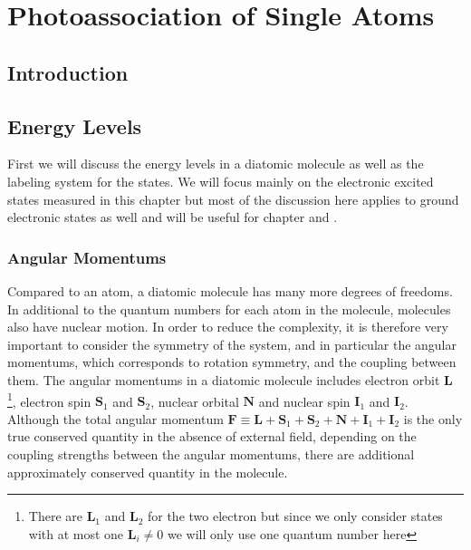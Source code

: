 
\chapter{Photoassociation of Single Atoms}
\label{ch:pa}

\section{Introduction}


\section{Energy Levels}

First we will discuss the energy levels in a diatomic molecule
as well as the labeling system for the states.
We will focus mainly on the electronic excited states measured in this chapter
but most of the discussion here applies to ground electronic states as well
and will be useful for chapter \label{ch:raman-spectroscopy} and \label{ch:raman-transfer}.

\subsection{Angular Momentums}

Compared to an atom, a diatomic molecule has many more degrees of freedoms.
In additional to the quantum numbers for each atom in the molecule,
molecules also have nuclear motion.
In order to reduce the complexity, it is therefore very important to consider the
symmetry of the system, and in particular the angular momentums,
which corresponds to rotation symmetry, and the coupling between them.
The angular momentums in a diatomic molecule includes electron orbit $\mathbf{L}$
\footnote{There are $\mathbf{L}_1$ and $\mathbf{L}_2$ for the two electron but since
  we only consider states with at most one $\mathbf{L}_i\neq0$ we will only use one quantum number here},
electron spin $\mathbf{S}_1$ and $\mathbf{S}_2$, nuclear orbital $\mathbf{N}$
and nuclear spin $\mathbf{I}_1$ and $\mathbf{I}_2$.
Although the total angular momentum
$\mathbf{F}\equiv\mathbf{L}+\mathbf{S}_1+\mathbf{S}_2+\mathbf{N}+\mathbf{I}_1+\mathbf{I}_2$
is the only true conserved quantity in the absence of external field,
depending on the coupling strengths between the angular momentums,
there are additional approximately conserved quantity in the molecule.

